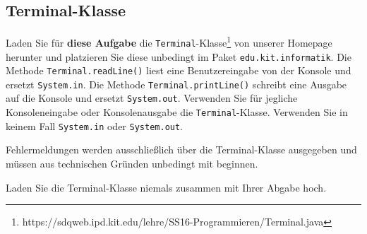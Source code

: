 \begin{tcolorbox}
\subsection*{Terminal-Klasse}
Laden Sie für \textbf{diese Aufgabe} die \texttt{Terminal}-Klasse\footnote{https://sdqweb.ipd.kit.edu/lehre/SS16-Programmieren/Terminal.java} von unserer Homepage herunter und platzieren Sie diese unbedingt im Paket \texttt{edu.kit.informatik}.
Die Methode \texttt{Terminal.readLine()} liest eine Benutzereingabe von der Konsole und ersetzt \texttt{System.in}.
Die Methode \texttt{Terminal.printLine()} schreibt eine Ausgabe auf die Konsole und ersetzt \texttt{System.out}.
Verwenden Sie für jegliche Konsoleneingabe oder Konsolenausgabe die \texttt{Terminal}-Klasse.
Verwenden Sie in keinem Fall \texttt{System.in} oder \texttt{System.out}.

Fehlermeldungen werden ausschließlich über die Terminal-Klasse ausgegeben und müssen aus technischen Gründen unbedingt mit  beginnen.


Laden Sie die Terminal-Klasse niemals zusammen mit Ihrer Abgabe hoch.
\end{tcolorbox}


